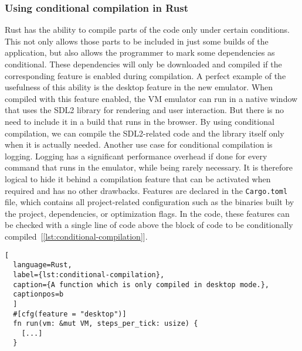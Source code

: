 \subsubsection{Using conditional compilation in Rust} \label{conditional-compilation}
Rust has the ability to compile parts of the code only under certain conditions.
This not only allows those parts to be included in just some builds of the application, but also allows the programmer to mark some dependencies as conditional.
These dependencies will only be downloaded and compiled if the corresponding feature is enabled during compilation.
A perfect example of the usefulness of this ability is the desktop feature in the new emulator.
When compiled with this feature enabled, the VM emulator can run in a native window that uses the SDL2 library for rendering and user interaction.
But there is no need to include it in a build that runs in the browser.
By using conditional compilation, we can compile the SDL2-related code and the library itself only when it is actually needed.
Another use case for conditional compilation is logging.
Logging has a significant performance overhead if done for every command that runs in the emulator, while being rarely necessary.
It is therefore logical to hide it behind a compilation feature that can be activated when required and has no other drawbacks.
Features are declared in the \verb+Cargo.toml+ file, which contains all project-related configuration such as the binaries built by the project, dependencies, or optimization flags.
In the code, these features can be checked with a single line of code above the block of code to be conditionally compiled~[\ref{lst:conditional-compilation}].

\begin{lstlisting}[
  language=Rust,
  label={lst:conditional-compilation},
  caption={A function which is only compiled in desktop mode.},
  captionpos=b
  ]
  #[cfg(feature = "desktop")]
  fn run(vm: &mut VM, steps_per_tick: usize) {
    [...]
  }
\end{lstlisting}

